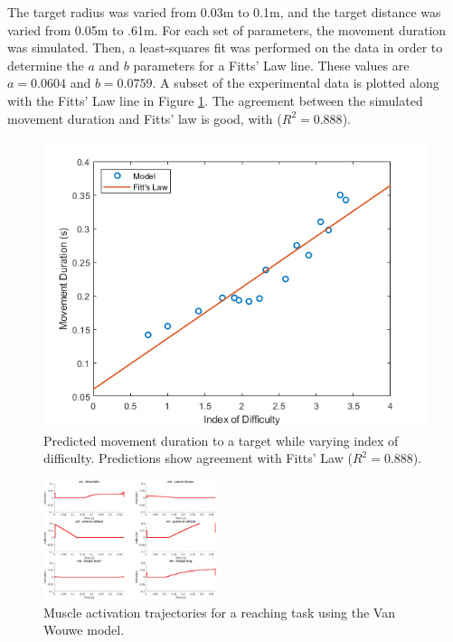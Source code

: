 \documentclass[letterpaper, 10pt, conference]{ieeeconf}
\begin{document}
\par The target radius was varied from 0.03m to 0.1m, and the target distance was varied from 0.05m to .61m. For each set of parameters, the movement duration was simulated. Then, a least-squares fit was performed on the data in order to determine the \(a\) and \(b\) parameters for a Fitts' Law line. These values are \(a = 0.0604\) and \(b = 0.0759\). A subset of the experimental data is plotted along with the Fitts' Law line in Figure \ref{fig:FittsLaw}. The agreement between the simulated movement duration and Fitts' law is good, with ($R^2 = 0.888$). 

\begin{figure}[h]
    \centering
    \includegraphics[width=1\linewidth]{FittsLawFinal.png}
    \caption{Predicted movement duration to a target while varying index of difficulty. Predictions show agreement with Fitts' Law ($R^2 = 0.888$).}
    \label{fig:FittsLaw}
\end{figure}

\begin{figure}[h]
    \centering
    \includegraphics[width=0.45\textwidth]{demo_activations_small.jpg}
    \caption{Muscle activation trajectories for a reaching task using the Van Wouwe model.}
    \label{fig:demo_activations}
\end{figure}
\end{document}
